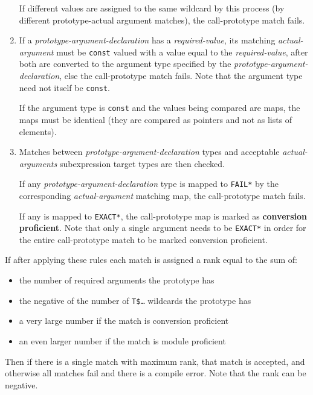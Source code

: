 \documentclass[12pt]{article}
\newcommand{\key}[1]{{\rm \bfseries #1}}
\begin{document}
\begin{enumerate}
If different values are assigned to the same wildcard by this
process (by different prototype-actual argument matches),
the call-prototype match fails.

\item\label{CALL-PROTOTYPE-REQUIRED-VALUES}
If a {\em prototype-argument-declaration} has a {\em required-value},
its matching {\em actual-argument} must be {\tt const} valued with
a value equal to the {\em required-value}, after both are converted
to the argument type specified by the {\em prototype-argument-declaration},
else the call-prototype
match fails.  Note that the argument type need not itself be {\tt const}.

If the argument type is {\tt const} and the values being compared are
maps, the maps must be identical (they are compared as pointers and
not as lists of elements).

\item\label{CALL-PROTOTYPE-ARGUMENT-TYPING}
Matches between {\em prototype-argument-declaration} types
and acceptable {\em actual-argu\-ments} subexpression target types
are then checked.

If any {\em prototype-argument-declaration} type is mapped to
{\tt *FAIL*} by the corresponding {\em actual-argument} matching map,
the call-prototype match fails.

If any is mapped to {\tt *EXACT*}, the call-prototype map is
marked as \key{conversion proficient}.  Note that only a single
argument needs to be {\tt *EXACT*} in order for the entire
call-prototype match to be marked conversion proficient.

\end{enumerate}

If after applying these rules each match is assigned a rank
equal to the sum of:
\begin{itemize}
\item the number of required arguments the prototype has
\item the negative of the number of {\tt T\$\ldots} wildcards
the prototype has
\item a very large number if the match is conversion proficient
\item an even larger number if the match is module proficient
\end{itemize}
Then if there is a single match with maximum rank, that match
is accepted, and otherwise all matches fail and there is
a compile error.  Note that the rank can be negative.
\end{document}
